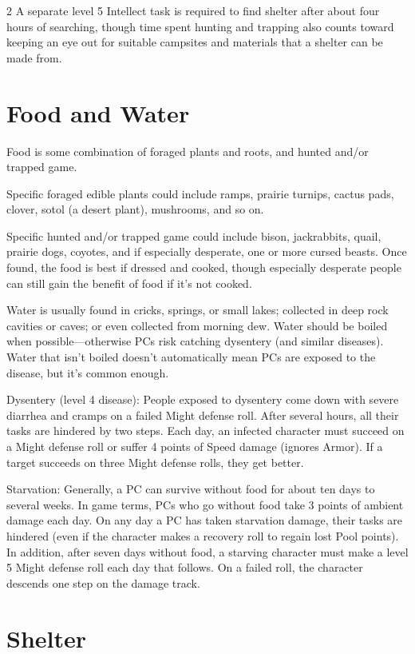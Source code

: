 \begin{multicols}{2}
A separate level 5 Intellect task is required to find shelter after about four hours of searching, though time spent hunting and trapping also counts toward keeping an eye out for suitable campsites and materials that a shelter can be made from.

\section{Food and Water}

Food is some combination of foraged plants and roots, and hunted and/or trapped game. 

Specific foraged edible plants could include ramps, prairie turnips, cactus pads, clover, sotol (a desert plant), mushrooms, and so on. 

Specific hunted and/or trapped game could include bison, jackrabbits, quail, prairie dogs, coyotes, and if especially desperate, one or more cursed beasts. Once found, the food is best if dressed and cooked, though especially desperate people can still gain the benefit of food if it’s not cooked. 

Water is usually found in cricks, springs, or small lakes; collected in deep rock cavities or caves; or even collected from morning dew. Water should be boiled when possible—otherwise PCs risk catching dysentery (and similar diseases). Water that isn’t boiled doesn’t automatically mean PCs are exposed to the disease, but it’s common enough. 

Dysentery (level 4 disease): People exposed to dysentery come down with severe diarrhea and cramps on a failed Might defense roll. After several hours, all their tasks are hindered by two steps. Each day, an infected character must succeed on a Might defense roll or suffer 4 points of Speed damage (ignores Armor). If a target succeeds on three Might defense rolls, they get better.

Starvation: Generally, a PC can survive without food for about ten days to several weeks. In game terms, PCs who go without food take 3 points of ambient damage each day. On any day a PC has taken starvation damage, their tasks are hindered (even if the character makes a recovery roll to regain lost Pool points). In addition, after seven days without food, a starving character must make a level 5 Might defense roll each day that follows. On a failed roll, the character descends one step on the damage track.

\section{Shelter}


\end{multicols}
